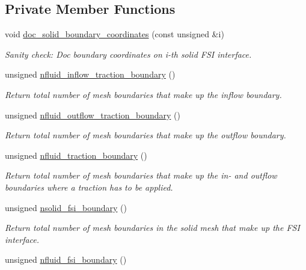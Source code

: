\subsection*{Private Member Functions}
\begin{DoxyCompactItemize}
\item 
void \hyperlink{classUnstructuredFSIProblem_a90c15e131c5ef01add676e0e78e5628c}{doc\+\_\+solid\+\_\+boundary\+\_\+coordinates} (const unsigned \&i)
\begin{DoxyCompactList}\small\item\em Sanity check\+: Doc boundary coordinates on i-\/th solid F\+SI interface. \end{DoxyCompactList}\item 
unsigned \hyperlink{classUnstructuredFSIProblem_a74a81b12db3e54dffcb68ebd0447610c}{nfluid\+\_\+inflow\+\_\+traction\+\_\+boundary} ()
\begin{DoxyCompactList}\small\item\em Return total number of mesh boundaries that make up the inflow boundary. \end{DoxyCompactList}\item 
unsigned \hyperlink{classUnstructuredFSIProblem_acc6f2d0f03a9bc1af96e85b54824a16b}{nfluid\+\_\+outflow\+\_\+traction\+\_\+boundary} ()
\begin{DoxyCompactList}\small\item\em Return total number of mesh boundaries that make up the outflow boundary. \end{DoxyCompactList}\item 
unsigned \hyperlink{classUnstructuredFSIProblem_a476394046c343524eefff856715eb722}{nfluid\+\_\+traction\+\_\+boundary} ()
\begin{DoxyCompactList}\small\item\em Return total number of mesh boundaries that make up the in-\/ and outflow boundaries where a traction has to be applied. \end{DoxyCompactList}\item 
unsigned \hyperlink{classUnstructuredFSIProblem_a3e4ee23245ec4c43e085006f5cd192e1}{nsolid\+\_\+fsi\+\_\+boundary} ()
\begin{DoxyCompactList}\small\item\em Return total number of mesh boundaries in the solid mesh that make up the F\+SI interface. \end{DoxyCompactList}\item 
unsigned \hyperlink{classUnstructuredFSIProblem_a7ef3b155002c3a71a7cb43d8c86a7a6d}{nfluid\+\_\+fsi\+\_\+boundary} ()

\end{DoxyCompactItemize}
